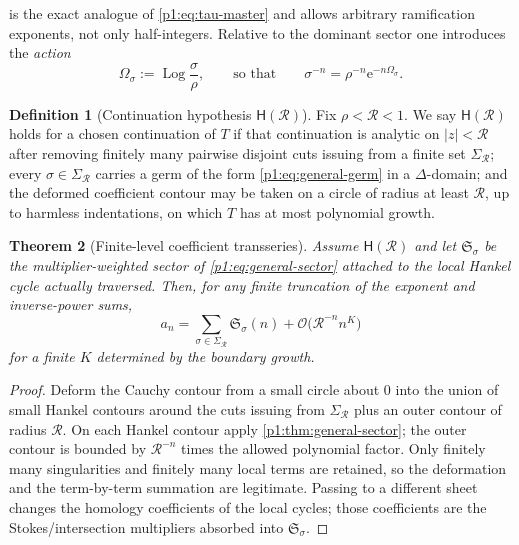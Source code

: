 \documentclass[11pt,a4paper,oneside]{book}
\theoremstyle{plain}
\newtheorem{theorem}{Theorem}[chapter]
\theoremstyle{definition}
\newtheorem{definition}[theorem]{Definition}
\theoremstyle{remark}
\newcommand{\e}{\mathrm{e}}
\newcommand{\bigO}{\mathcal{O}}
\begin{document}
 is the exact analogue of \cref{p1:eq:tau-master} and allows
arbitrary ramification exponents, not only half-integers.  Relative to the dominant sector one
introduces the \emph{action}
\begin{equation}
 \Omega_\sigma:=\operatorname{Log}\frac{\sigma}{\rho},
 \qquad\text{so that}\qquad
 \sigma^{-n}=\rho^{-n}\e^{-n\Omega_\sigma}.
 \label{p1:eq:action}
\end{equation}

\begin{definition}[Continuation hypothesis $\mathsf H(\mathcal R)$]
\label{p1:def:HR}
Fix $\rho<\mathcal R<1$.  We say $\mathsf H(\mathcal R)$ holds for a chosen continuation of
$T$ if that continuation is analytic on $|z|<\mathcal R$ after removing finitely many pairwise
disjoint cuts issuing from a finite set $\Sigma_{\mathcal R}$; every
$\sigma\in\Sigma_{\mathcal R}$ carries a germ of the form \cref{p1:eq:general-germ} in a
$\Delta$-domain; and the deformed coefficient contour may be taken on a circle of radius at
least $\mathcal R$, up to harmless indentations, on which $T$ has at most polynomial growth.
\end{definition}

\begin{theorem}[Finite-level coefficient transseries]
\label{p1:thm:finite-level}
Assume $\mathsf H(\mathcal R)$ and let $\mathfrak S_\sigma$ be the multiplier-weighted sector
of \cref{p1:eq:general-sector} attached to the local Hankel cycle actually traversed.  Then,
for any finite truncation of the exponent and inverse-power sums,
\begin{equation}
 a_n=\sum_{\sigma\in\Sigma_{\mathcal R}}
 \mathfrak S_\sigma(n)+\bigO\bigl(\mathcal R^{-n}n^{K}\bigr)
 \label{p1:eq:finite-level}
\end{equation}
for a finite $K$ determined by the boundary growth.
\end{theorem}

\begin{proof}
Deform the Cauchy contour from a small circle about $0$ into the union of small Hankel
contours around the cuts issuing from $\Sigma_{\mathcal R}$ plus an outer contour of radius
$\mathcal R$.  On each Hankel contour apply \cref{p1:thm:general-sector}; the outer contour is
bounded by $\mathcal R^{-n}$ times the allowed polynomial factor.  Only finitely many
singularities and finitely many local terms are retained, so the deformation and the
term-by-term summation are legitimate.  Passing to a different sheet changes the homology
coefficients of the local cycles; those coefficients are the Stokes/intersection multipliers
absorbed into $\mathfrak S_\sigma$.
\end{proof}
\end{document}

